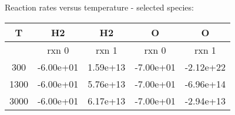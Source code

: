 \documentclass[11pt,letter]{article}
\begin{document}
Reaction rates versus temperature - selected species:\begin{table}[h]
\begin{tabular}{c|c|c|c|c}
\hline
T & H2 & H2 & O & O\\
\hline
 & rxn 0 & rxn 1 & rxn 0 & rxn 1\\
\hline
300 & -6.00e+01 & 1.59e+13 & -7.00e+01 & -2.12e+22\\
\hline
1300 & -6.00e+01 & 5.76e+13 & -7.00e+01 & -6.96e+14\\
\hline
3000 & -6.00e+01 & 6.17e+13 & -7.00e+01 & -2.94e+13\\
\end{tabular}
\end{table}
\end{document}
